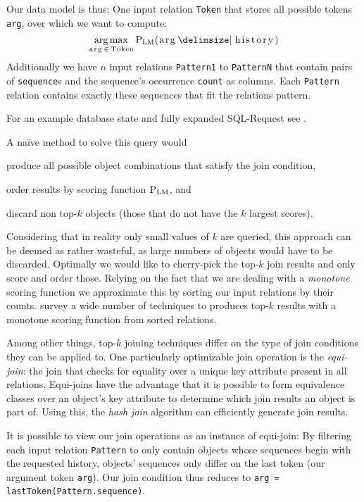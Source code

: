 \documentclass[m,bachelor,binding,palatino]{WeSTthesis}
\renewcommand\cref{\Cref}
\DeclareMathOperator*{\Argmax}{arg\,max}
\newcommand{\inlinecode}[1]{\lstinline[columns=fixed]{#1}}
\begin{document}
Our data model is thus: One input relation \inlinecode{Token} that stores
all possible tokens \inlinecode{arg}, over which we want to compute:
\begin{equation}
  \Argmax_{\text{\inlinecode{arg}} \, \in \, \text{\inlinecode{Token}}}
    \Prob[\text{LM}]{\text{\inlinecode{arg}}}{\text{\inlinecode{history}}}
\end{equation}
Additionally we have $n$ input relations
\inlinecode{Pattern1} to \inlinecode{PatternN} that contain pairs
of \inlinecode{sequence}s and the sequence's occurrence \inlinecode{count} as
columns.
Each \inlinecode{Pattern} relation contains exactly these sequences that fit the
relations pattern.

For an example database state and fully expanded SQL-Request see
\cref{app:sql-example}.

A naïve method to solve this query would
\begin{inparaenum}[(1)]
  \item produce all possible object combinations that satisfy the join
    condition,
  \item order results by scoring function $\Prob[\text{LM}]$, and
  \item discard non top-$k$ objects (those that do not have the $k$ largest
    scores).
\end{inparaenum}

Considering that in reality only small values of $k$ are queried, this approach
can be deemed as rather wasteful, as large numbers of objects would have to be
discarded.
Optimally we would like to cherry-pick the top-$k$ join results and only
score and order those.
Relying on the fact that we are dealing with a \emph{monotone} scoring function
we approximate this by sorting our input relations by their counts.
\cite{Ilyas2008} survey a wide number of techniques to produces top-$k$ results
with a monotone scoring function from sorted relations.

Among other things, top-$k$ joining techniques differ on the type of join
conditions they can be applied to.
One particularly optimizable join operation is the \emph{equi-join}:
the join that checks for equality over a unique key attribute present in all
relations.
Equi-joins have the advantage that it is possible to form equivalence classes
over an object's key attribute to determine which join results an object is
part of.
Using this, the \emph{hash join} algorithm can efficiently generate join
results.

It is possible to view our join operations as an instance of equi-join:
By filtering each input relation \inlinecode{Pattern} to only contain
objects whose sequences begin with the requested history, objects'
sequences only differ on the last token (our argument token \inlinecode{arg}).
Our join condition thus reduces to
\inlinecode{arg = lastToken(Pattern.sequence)}.
\end{document}
